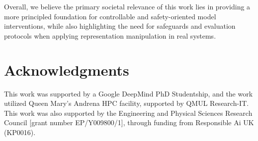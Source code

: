 \documentclass{article}
\theoremstyle{plain}
\theoremstyle{definition}
\theoremstyle{remark}
\begin{document}
Overall, we believe the primary societal relevance of this work lies in providing a more principled foundation for controllable and safety-oriented model interventions, while also highlighting the need for safeguards and evaluation protocols when applying representation manipulation in real systems.

\section*{Acknowledgments}
This work was supported by a Google DeepMind PhD Studentship, and the work utilized Queen Mary’s Andrena HPC facility, supported by QMUL Research-IT. This work was also supported by the Engineering and Physical Sciences Research Council [grant number EP/Y009800/1], through funding from Responsible Ai UK (KP0016). 


% 
% 




\newpage
\appendix
\onecolumn


\end{document}
